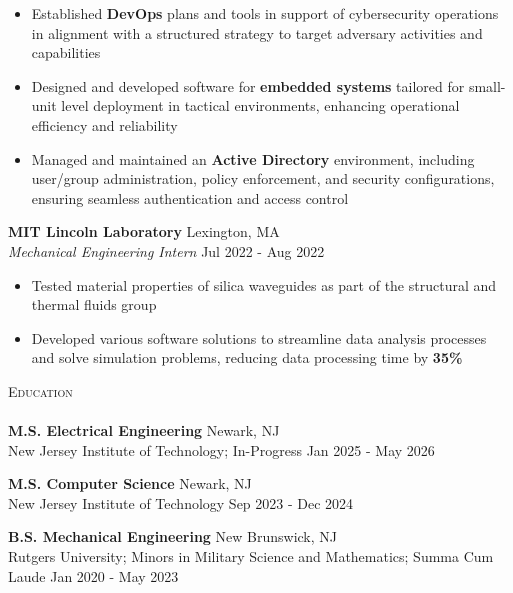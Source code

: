 \documentclass[a4paper]{article}
\newcommand{\lineunder} {
        \vspace*{-8pt} \\
        \hspace*{-18pt} \hrulefill \\
    }
\newcommand{\header} [1] {
        {\hspace*{-18pt}\vspace*{6pt} \textsc{#1}}
        \vspace*{-6pt} \lineunder
    }
\begin{document}
                \begin{itemize} \itemsep 1pt
                
                \item Established \textbf{DevOps} plans and tools in support of cybersecurity operations in alignment with a structured strategy to target adversary activities and capabilities
                \item Designed and developed software for \textbf{embedded systems} tailored for small-unit level deployment in tactical environments, enhancing operational efficiency and reliability
                \item Managed and maintained an \textbf{Active Directory} environment, including user/group administration, policy enforcement, and security configurations, ensuring seamless authentication and access control\end{itemize}
                \textbf{MIT Lincoln Laboratory} \hfill Lexington, MA\\
                \textit{Mechanical Engineering Intern} \hfill Jul 2022 - Aug 2022\\
                \vspace{-1mm}
                \begin{itemize} \itemsep 1pt
                
                \item Tested material properties of silica waveguides as part of the structural and thermal fluids group
                \item Developed various software solutions to streamline data analysis processes and solve simulation problems, reducing data processing time by \textbf{35\%}\end{itemize}
    \header{Education}
    
            \textbf{M.S. Electrical Engineering} \hfill Newark, NJ\\
            New Jersey Institute of Technology; In-Progress \hfill Jan 2025 - May 2026\\
            \vspace{2mm}
            
            \textbf{M.S. Computer Science} \hfill Newark, NJ\\
            New Jersey Institute of Technology \hfill Sep 2023 - Dec 2024\\
            \vspace{2mm}
            
            \textbf{B.S. Mechanical Engineering} \hfill New Brunswick, NJ\\
            Rutgers University; Minors in Military Science and Mathematics; Summa Cum Laude \hfill Jan 2020 - May 2023\\
            \vspace{2mm}
            
\end{document}
